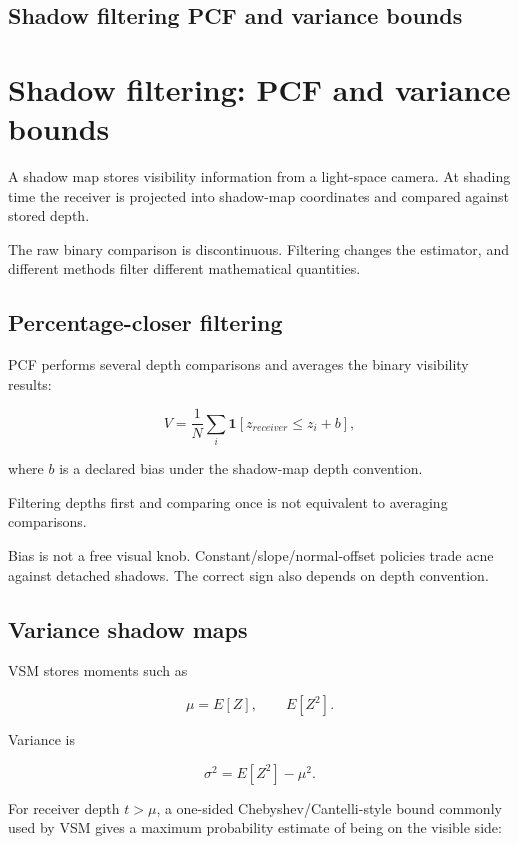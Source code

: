 \hypertarget{appendix-7cac8a689849}{}
\section*{Shadow filtering PCF and variance bounds}
\chapter{Shadow filtering: PCF and variance bounds}\label{appendix-7cac8a689849-shadow-filtering-pcf-and-variance-bounds}

A shadow map stores visibility information from a light-space camera. At shading time the receiver is projected into shadow-map coordinates and compared against stored depth.

The raw binary comparison is discontinuous. Filtering changes the estimator, and different methods filter different mathematical quantities.

\section{Percentage-closer filtering}\label{appendix-7cac8a689849-percentage-closer-filtering}

PCF performs several depth comparisons and averages the binary visibility results:

\[
V=
\frac{1}{N}
\sum_i
\mathbf 1[z_{receiver}\le z_i+b],
\]

where \(b\) is a declared bias under the shadow-map depth convention.

Filtering depths first and comparing once is not equivalent to averaging comparisons.

Bias is not a free visual knob. Constant/slope/normal-offset policies trade acne against detached shadows. The correct sign also depends on depth convention.

\section{Variance shadow maps}\label{appendix-7cac8a689849-variance-shadow-maps}

VSM stores moments such as

\[
\mu=E[Z],
\qquad
E[Z^2].
\]

Variance is

\[
\sigma^2=E[Z^2]-\mu^2.
\]

For receiver depth \(t>\mu\), a one-sided Chebyshev/Cantelli-style bound commonly used by VSM gives a maximum probability estimate of being on the visible side:

